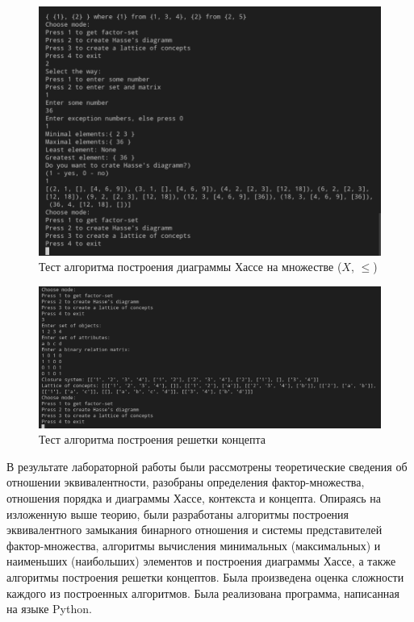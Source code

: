 \documentclass[bachelor, och, labwork]{shiza}
\begin{document}
        \begin{figure}[H]
            \centering
            \includegraphics[width=1\textwidth]{photo/2.png}
            \caption{Тест алгоритма построения диаграммы Хассе на множестве ($X$, $\leq$)}
        \end{figure}

        \begin{figure}[H]
            \centering
            \includegraphics[width=1\textwidth]{photo/4.png}
            \caption{Тест алгоритма построения решетки концепта}
        \end{figure} 
    \newpage
 
    \conclusion
    
    В результате лабораторной работы были рассмотрены теоретические сведения об отношении эквивалентности, разобраны
    определения фактор-множества, отношения порядка и диаграммы Хассе, контекста и концепта. Опираясь на изложенную
    выше теорию, были разработаны алгоритмы построения эквивалентного замыкания бинарного отношения и системы представителей
    фактор-множества, алгоритмы вычисления минимальных (максимальных) и наименьших (наибольших) элементов и построения
    диаграммы Хассе, а также алгоритмы построения решетки концептов. Была произведена оценка сложности каждого из 
    построенных алгоритмов. Была реализована программа, написанная на языке Python.
    
\end{document}
